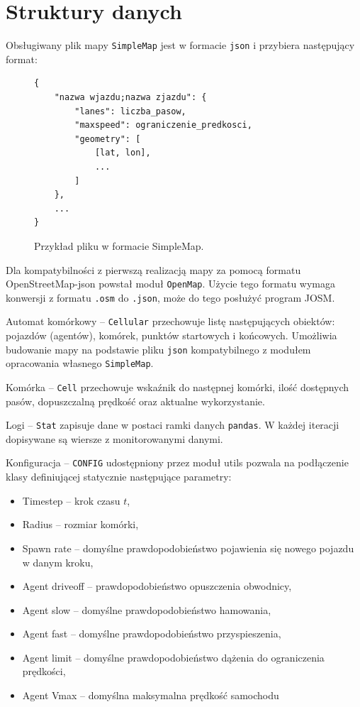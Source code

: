 \documentclass[a4paper,12pt]{article}
\begin{document}
    \section{Struktury danych}
    Obsługiwany plik mapy \texttt{SimpleMap} jest w formacie \texttt{json} i przybiera następujący format:
	\begin{figure}[H]
	    \centering
	    \begin{lstlisting}
{
	"nazwa wjazdu;nazwa zjazdu": {
		"lanes": liczba_pasow,
		"maxspeed": ograniczenie_predkosci,
		"geometry": [
			[lat, lon],
			...
		]
	},
	...
}
	    \end{lstlisting}
	    \caption{Przykład pliku w formacie SimpleMap.}
	    \label{sm-format}
	\end{figure}
	Dla kompatybilności z pierwszą realizacją mapy za pomocą formatu OpenStreetMap-json powstał moduł \texttt{OpenMap}. Użycie tego formatu wymaga konwersji z formatu \texttt{.osm} do \texttt{.json}, może do tego posłużyć program JOSM.
    
    \label{automat}
    Automat komórkowy -- \texttt{Cellular} przechowuje listę następujących obiektów: pojazdów (agentów), komórek, punktów startowych i końcowych.
    Umożliwia budowanie mapy na podstawie pliku \texttt{json} kompatybilnego z modułem opracowania własnego \texttt{SimpleMap}.
    
    Komórka -- \texttt{Cell} przechowuje wskaźnik do następnej komórki, ilość dostępnych pasów, dopuszczalną prędkość oraz aktualne wykorzystanie.
    
    Logi -- \texttt{Stat} zapisuje dane w postaci ramki danych \texttt{pandas}. W każdej iteracji dopisywane są wiersze z monitorowanymi danymi.
    
    \label{logs}
    Konfiguracja -- \texttt{CONFIG} udostępniony przez moduł utils pozwala na podłączenie klasy definiującej statycznie następujące parametry:
    \begin{itemize}
    	\item Timestep -- krok czasu $t$,
    	\item Radius -- rozmiar komórki,
    	\item Spawn rate -- domyślne prawdopodobieństwo pojawienia się nowego pojazdu w danym kroku,
    	\item Agent driveoff -- prawdopodobieństwo opuszczenia obwodnicy,
    	\item Agent slow -- domyślne prawdopodobieństwo hamowania,
    	\item Agent fast -- domyślne prawdopodobieństwo przyspieszenia,
    	\item Agent limit -- domyślne prawdopodobieństwo dążenia do ograniczenia prędkości,
    	\item Agent Vmax -- domyślna maksymalna prędkość samochodu
    \end{itemize}
\end{document}
